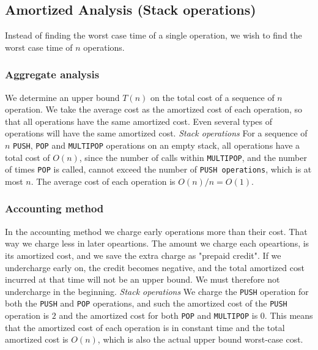 \subsection*{Amortized Analysis (Stack operations)}
Instead of finding the worst case time of a single operation, we wish to find
the worst case time of $n$ operations.

\subsubsection*{Aggregate analysis}
We determine an upper bound $T(n)$ on the total cost of a sequence of $n$
operation. We take the average cost as the amortized cost of each operation, so
that all operations have the same amortized cost. Even several types of
operations will have the same amortized cost.
\newline\newline\textit{Stack operations}\newline
For a sequence of $n$ \texttt{PUSH}, \texttt{POP} and \texttt{MULTIPOP}
operations on an empty stack, all operations have a total cost of $O(n)$, since
the number of calls within \texttt{MULTIPOP}, and the number of times
\texttt{POP} is called, cannot exceed the number of \texttt{PUSH operations},
which is at most $n$. The average cost of each operation is $O(n)/n=O(1)$.

\subsubsection*{Accounting method}
In the accounting method we charge early operations more than their cost. That
way we charge less in later opeartions. The amount we charge each opeartions, is
its amortized cost, and we save the extra charge as "prepaid credit". If we
undercharge early on, the credit becomes negative, and the total amortized cost
incurred at that time will not be an upper bound. We must therefore not
undercharge in the beginning.
\newline\newline\textit{Stack operations}\newline
We charge the \texttt{PUSH} operation for both the \texttt{PUSH} and
\texttt{POP} operations, and such the amortized cost of the \texttt{PUSH}
operation is $2$ and the amortized cost for both \texttt{POP} and
\texttt{MULTIPOP} is $0$. This means that the amortized cost of each operation
is in constant time and the total amortized cost is $O(n)$, which is also the
actual upper bound worst-case cost.

